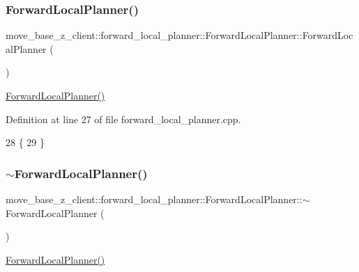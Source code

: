 \subsubsection{\texorpdfstring{Forward\+Local\+Planner()}{ForwardLocalPlanner()}}
{\footnotesize\ttfamily move\+\_\+base\+\_\+z\+\_\+client\+::forward\+\_\+local\+\_\+planner\+::\+Forward\+Local\+Planner\+::\+Forward\+Local\+Planner (\begin{DoxyParamCaption}{ }\end{DoxyParamCaption})}

\hyperlink{classmove__base__z__client_1_1forward__local__planner_1_1ForwardLocalPlanner_a651c98a53a75d9c8872ba17cdf1d0324}{Forward\+Local\+Planner()} 

Definition at line 27 of file forward\+\_\+local\+\_\+planner.\+cpp.


\begin{DoxyCode}
28 \{
29 \}
\end{DoxyCode}
\mbox{\label{classmove__base__z__client_1_1forward__local__planner_1_1ForwardLocalPlanner_aae932e6e3203fdf2f33b7ccab9f27658}} 
\subsubsection{\texorpdfstring{$\sim$\+Forward\+Local\+Planner()}{~ForwardLocalPlanner()}}
{\footnotesize\ttfamily move\+\_\+base\+\_\+z\+\_\+client\+::forward\+\_\+local\+\_\+planner\+::\+Forward\+Local\+Planner\+::$\sim$\+Forward\+Local\+Planner (\begin{DoxyParamCaption}{ }\end{DoxyParamCaption})\hspace{0.3cm}{\ttfamily [virtual]}}

\hyperlink{classmove__base__z__client_1_1forward__local__planner_1_1ForwardLocalPlanner_a651c98a53a75d9c8872ba17cdf1d0324}{Forward\+Local\+Planner()} 

